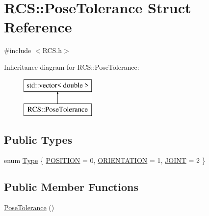 \hypertarget{structRCS_1_1PoseTolerance}{\section{R\-C\-S\-:\-:Pose\-Tolerance Struct Reference}
\label{structRCS_1_1PoseTolerance}
}


{\ttfamily \#include $<$R\-C\-S.\-h$>$}

Inheritance diagram for R\-C\-S\-:\-:Pose\-Tolerance\-:\begin{figure}[H]
\begin{center}
\leavevmode
\includegraphics[height=2.000000cm]{structRCS_1_1PoseTolerance}
\end{center}
\end{figure}
\subsection*{Public Types}
\begin{DoxyCompactItemize}
\item 
enum \hyperlink{structRCS_1_1PoseTolerance_ab4307fac8693b1be023ed6b400ceac5b}{Type} \{ \hyperlink{structRCS_1_1PoseTolerance_ab4307fac8693b1be023ed6b400ceac5ba6b7feecf2cffe65d20a3d8226c7f06de}{P\-O\-S\-I\-T\-I\-O\-N} = 0, 
\hyperlink{structRCS_1_1PoseTolerance_ab4307fac8693b1be023ed6b400ceac5baa9a7358a420dc0961069428aedf2fd97}{O\-R\-I\-E\-N\-T\-A\-T\-I\-O\-N} = 1, 
\hyperlink{structRCS_1_1PoseTolerance_ab4307fac8693b1be023ed6b400ceac5ba214d30542fd89e624931dec916b4db68}{J\-O\-I\-N\-T} = 2
 \}
\end{DoxyCompactItemize}
\subsection*{Public Member Functions}
\begin{DoxyCompactItemize}
\item 
\hyperlink{structRCS_1_1PoseTolerance_adb9beae3f4967a164c207ef37cc2ce2f}{Pose\-Tolerance} ()
\end{DoxyCompactItemize}


